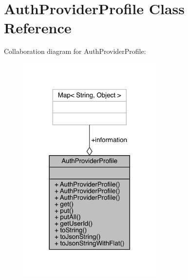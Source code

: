 \hypertarget{classcom_1_1toast_1_1android_1_1gamebase_1_1base_1_1auth_1_1_auth_provider_profile}{}\section{Auth\+Provider\+Profile Class Reference}
\label{classcom_1_1toast_1_1android_1_1gamebase_1_1base_1_1auth_1_1_auth_provider_profile}


Collaboration diagram for Auth\+Provider\+Profile\+:
\nopagebreak
\begin{figure}[H]
\begin{center}
\leavevmode
\includegraphics[width=204pt]{classcom_1_1toast_1_1android_1_1gamebase_1_1base_1_1auth_1_1_auth_provider_profile__coll__graph}
\end{center}
\end{figure}
